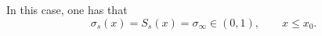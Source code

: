\documentclass[12pt]{article}
\theoremstyle{definition}
\theoremstyle{remark}
\numberwithin{equation}{section}
\begin{document}



In this case, one has that 
\begin{equation}
    \sigma_s(x) = S_s(x) = \sigma_{\infty} \in (0,1), \qquad x \leq x_0. 
\end{equation}
\end{document}
